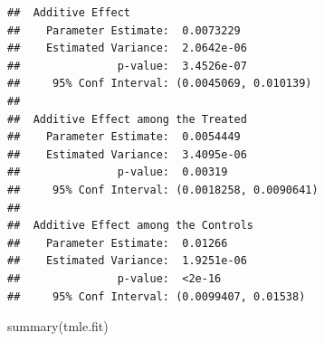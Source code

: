 \documentclass[
]{book}
\newenvironment{Shaded}{\begin{snugshade}}{\end{snugshade}}
\newcommand{\AttributeTok}[1]{\textcolor[rgb]{0.77,0.63,0.00}{#1}}
\newcommand{\DecValTok}[1]{\textcolor[rgb]{0.00,0.00,0.81}{#1}}
\newcommand{\FunctionTok}[1]{\textcolor[rgb]{0.00,0.00,0.00}{#1}}
\newcommand{\NormalTok}[1]{#1}
\newcommand{\OtherTok}[1]{\textcolor[rgb]{0.56,0.35,0.01}{#1}}
\newcommand{\SpecialCharTok}[1]{\textcolor[rgb]{0.00,0.00,0.00}{#1}}
\newcommand{\StringTok}[1]{\textcolor[rgb]{0.31,0.60,0.02}{#1}}
\begin{document}
\begin{Shaded}
\end{Shaded}

\begin{verbatim}
##  Additive Effect
##    Parameter Estimate:  0.0073229
##    Estimated Variance:  2.0642e-06
##               p-value:  3.4526e-07
##     95% Conf Interval: (0.0045069, 0.010139) 
## 
##  Additive Effect among the Treated
##    Parameter Estimate:  0.0054449
##    Estimated Variance:  3.4095e-06
##               p-value:  0.00319
##     95% Conf Interval: (0.0018258, 0.0090641) 
## 
##  Additive Effect among the Controls
##    Parameter Estimate:  0.01266
##    Estimated Variance:  1.9251e-06
##               p-value:  <2e-16
##     95% Conf Interval: (0.0099407, 0.01538)
\end{verbatim}

\begin{Shaded}
\begin{Highlighting}[]
\FunctionTok{summary}\NormalTok{(tmle.fit)}
\end{Highlighting}
\end{Shaded}
\end{document}
